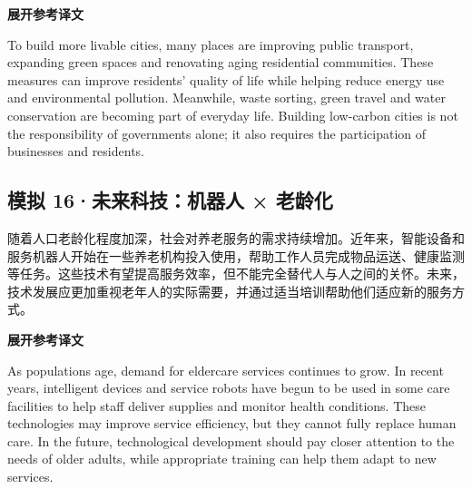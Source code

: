 \documentclass[a4paper,11pt,UTF8,fontset=none]{ctexart}
\begin{document}
\noindent\colorbox{HeadBlue}{\strut {\bfseries 展开参考译文}}\par\vspace{1pt}

\noindent To build more livable cities, many places are improving public transport, expanding green spaces and renovating aging residential communities. These measures can improve residents’ quality of life while helping reduce energy use and environmental pollution. Meanwhile, waste sorting, green travel and water conservation are becoming part of everyday life. Building low-carbon cities is not the responsibility of governments alone; it also requires the participation of businesses and residents.\par

\vspace{4pt}

\subsection{模拟 16·未来科技：机器人 × 老龄化}

\par

\noindent 随着人口老龄化程度加深，社会对养老服务的需求持续增加。近年来，智能设备和服务机器人开始在一些养老机构投入使用，帮助工作人员完成物品运送、健康监测等任务。这些技术有望提高服务效率，但不能完全替代人与人之间的关怀。未来，技术发展应更加重视老年人的实际需要，并通过适当培训帮助他们适应新的服务方式。\par

\noindent\colorbox{HeadBlue}{\strut {\bfseries 展开参考译文}}\par\vspace{1pt}

\noindent As populations age, demand for eldercare services continues to grow. In recent years, intelligent devices and service robots have begun to be used in some care facilities to help staff deliver supplies and monitor health conditions. These technologies may improve service efficiency, but they cannot fully replace human care. In the future, technological development should pay closer attention to the needs of older adults, while appropriate training can help them adapt to new services.\par

\vspace{4pt}

\end{document}
